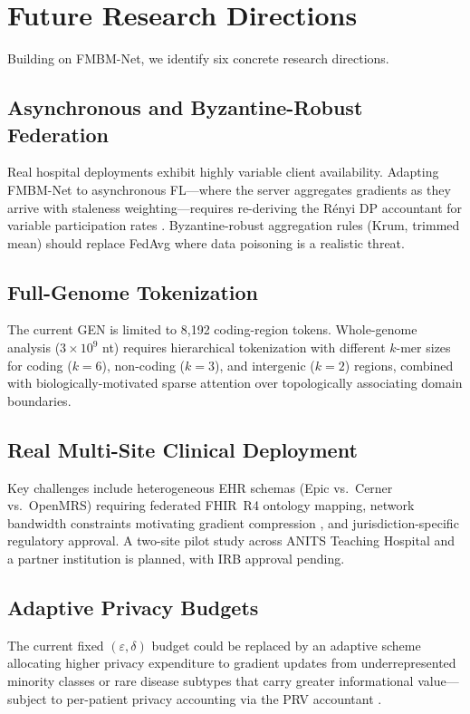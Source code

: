 \documentclass[a4paper,fleqn]{cas-dc}
\begin{document}

\section{Future Research Directions}


Building on FMBM-Net, we identify six concrete research directions.

\subsection{Asynchronous and Byzantine-Robust Federation}
Real hospital deployments exhibit highly variable client availability. Adapting FMBM-Net to asynchronous FL---where the server aggregates gradients as they arrive with staleness weighting---requires re-deriving the R\'{e}nyi DP accountant for variable participation rates \citep{mironov2017renyi}. Byzantine-robust aggregation rules (Krum, trimmed mean) should replace FedAvg where data poisoning is a realistic threat.

\subsection{Full-Genome Tokenization}
The current GEN is limited to 8,192 coding-region tokens. Whole-genome analysis ($3\!\times\!10^9$ nt) requires hierarchical tokenization with different $k$-mer sizes for coding ($k\!=\!6$), non-coding ($k\!=\!3$), and intergenic ($k\!=\!2$) regions, combined with biologically-motivated sparse attention over topologically associating domain boundaries.

\subsection{Real Multi-Site Clinical Deployment}
Key challenges include heterogeneous EHR schemas (Epic vs.\ Cerner vs.\ OpenMRS) requiring federated FHIR~R4 ontology mapping, network bandwidth constraints motivating gradient compression \citep{karimireddy2020scaffold}, and jurisdiction-specific regulatory approval. A two-site pilot study across ANITS Teaching Hospital and a partner institution is planned, with IRB approval pending.

\subsection{Adaptive Privacy Budgets}
The current fixed $(\varepsilon,\delta)$ budget could be replaced by an adaptive scheme allocating higher privacy expenditure to gradient updates from underrepresented minority classes or rare disease subtypes that carry greater informational value---subject to per-patient privacy accounting via the PRV accountant \citep{gopi2021prv}.
\end{document}

